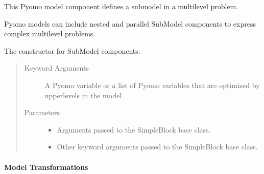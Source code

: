 \documentclass[letterpaper,10pt,english]{sphinxmanual}
\begin{document}
\begin{fulllineitems}
\label{\detokenize{reference/pyomo:pao.pyomo.components.SubModel}}
This Pyomo model component defines a sub\sphinxhyphen{}model in a multi\sphinxhyphen{}level problem.

Pyomo models can include nested and parallel SubModel components to express
complex multi\sphinxhyphen{}level problems.

\begin{fulllineitems}
\label{\detokenize{reference/pyomo:pao.pyomo.components.SubModel.__init__}}
The constructor for SubModel components.
\begin{quote}\begin{description}
\item[{Keyword Arguments}] \leavevmode
{} \textendash{} A Pyomo variable or a list of Pyomo variables that are optimized by upper\sphinxhyphen{}levels in the model.

\item[{Parameters}] \leavevmode\begin{itemize}
\item {} 
 \textendash{} Arguments passed to the SimpleBlock base class.

\item {} 
 \textendash{} Other keyword arguments passed to the SimpleBlock base class.

\end{itemize}

\end{description}\end{quote}

\end{fulllineitems}


\end{fulllineitems}



\paragraph{Model Transformations}
\label{\detokenize{reference/pyomo:model-transformations}}
\end{document}

